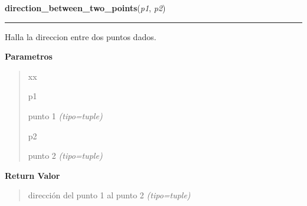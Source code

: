 \hspace{.8\funcindent}\begin{boxedminipage}{\funcwidth}

    \raggedright \textbf{direction\_between\_two\_points}(\textit{p1}, \textit{p2})

    \vspace{-1.5ex}

    \rule{\textwidth}{0.5\fboxrule}
\setlength{\parskip}{2ex}
Halla la direccion entre dos puntos dados.

\setlength{\parskip}{1ex}
      \textbf{Parametros}
      \vspace{-1ex}

      \begin{quote}
        \begin{Ventry}{xx}

          \item[p1]


punto 1
            {\it (tipo=tuple)}

          \item[p2]


punto 2
            {\it (tipo=tuple)}

        \end{Ventry}

      \end{quote}

      \textbf{Return Valor}
    \vspace{-1ex}

      \begin{quote}

dirección del punto 1 al punto 2
      {\it (tipo=tuple)}

      \end{quote}

    \end{boxedminipage}

    \label{src:functions:get_max_edge}

    \vspace{0.5ex}

